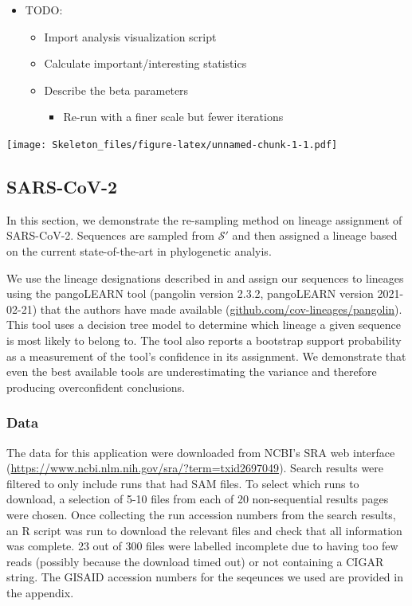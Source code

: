 \documentclass[
]{article}
\providecommand{\tightlist}{%
  \setlength{\itemsep}{0pt}\setlength{\parskip}{0pt}}
\newcommand{\nps}{\mathcal{S}} %
\begin{document}
\begin{itemize}
\tightlist
\item
  TODO:

  \begin{itemize}
  \tightlist
  \item
    Import analysis visualization script
  \item
    Calculate important/interesting statistics
  \item
    Describe the beta parameters

    \begin{itemize}
    \tightlist
    \item
      Re-run with a finer scale but fewer iterations
    \end{itemize}
  \end{itemize}
\end{itemize}

\texttt{[image: Skeleton\_files/figure-latex/unnamed-chunk-1-1.pdf]}

\hypertarget{sars-cov-2}{%
\subsection{SARS-CoV-2}\label{sars-cov-2}}

In this section, we demonstrate the re-sampling method on lineage
assignment of SARS-CoV-2. Sequences are sampled from \(\nps'\) and then
assigned a lineage based on the current state-of-the-art in phylogenetic
analyis.

We use the lineage designations described in
\citet{rambautDynamicNomenclatureProposal2020} and assign our sequences
to lineages using the pangoLEARN tool (pangolin version 2.3.2,
pangoLEARN version 2021-02-21) that the authors have made available
(\url{github.com/cov-lineages/pangolin}). This tool uses a decision tree
model to determine which lineage a given sequence is most likely to
belong to. The tool also reports a bootstrap support probability as a
measurement of the tool's confidence in its assignment. We demonstrate
that even the best available tools are underestimating the variance and
therefore producing overconfident conclusions.

\hypertarget{data}{%
\subsubsection{Data}\label{data}}

The data for this application were downloaded from NCBI's SRA web
interface (\url{https://www.ncbi.nlm.nih.gov/sra/?term=txid2697049}).
Search results were filtered to only include runs that had SAM files. To
select which runs to download, a selection of 5-10 files from each of 20
non-sequential results pages were chosen. Once collecting the run
accession numbers from the search results, an R script was run to
download the relevant files and check that all information was complete.
23 out of 300 files were labelled incomplete due to having too few reads
(possibly because the download timed out) or not containing a CIGAR
string. The GISAID accession numbers for the seqeunces we used are
provided in the appendix.
\end{document}
